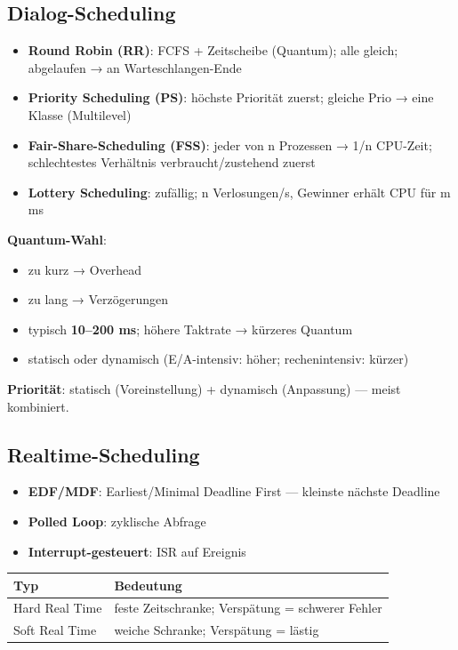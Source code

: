 \documentclass[11pt, a4paper]{article}
\begin{document}
\subsection{Dialog-Scheduling}
\begin{itemize}
  \item \textbf{Round Robin (RR)}: FCFS + Zeitscheibe (Quantum); alle gleich; abgelaufen → an Warteschlangen-Ende
  \item \textbf{Priority Scheduling (PS)}: höchste Priorität zuerst; gleiche Prio → eine Klasse (Multilevel)
  \item \textbf{Fair-Share-Scheduling (FSS)}: jeder von n Prozessen → 1/n CPU-Zeit; schlechtestes Verhältnis verbraucht/zustehend zuerst
  \item \textbf{Lottery Scheduling}: zufällig; n Verlosungen/s, Gewinner erhält CPU für m ms
\end{itemize}

\textbf{Quantum-Wahl}:

\begin{itemize}
  \item zu kurz → Overhead
  \item zu lang → Verzögerungen
  \item typisch \textbf{10–200 ms}; höhere Taktrate → kürzeres Quantum
  \item statisch oder dynamisch (E/A-intensiv: höher; rechenintensiv: kürzer)
\end{itemize}

\textbf{Priorität}: statisch (Voreinstellung) + dynamisch (Anpassung) — meist kombiniert.



\subsection{Realtime-Scheduling}
\begin{itemize}
  \item \textbf{EDF/MDF}: Earliest/Minimal Deadline First — kleinste nächste Deadline
  \item \textbf{Polled Loop}: zyklische Abfrage
  \item \textbf{Interrupt-gesteuert}: ISR auf Ereignis
\end{itemize}


{\small
\begin{tabularx}{\linewidth}{XX}
\hline
\rowcolor{tableheadbg}
{\color{white}\textbf{Typ}} & {\color{white}\textbf{Bedeutung}} \\[2pt]
\hline
\endhead
\hline
\endfoot
Hard Real Time & feste Zeitschranke; Verspätung = schwerer Fehler \\
Soft Real Time & weiche Schranke; Verspätung = lästig \\
\end{tabularx}
}
\end{document}
